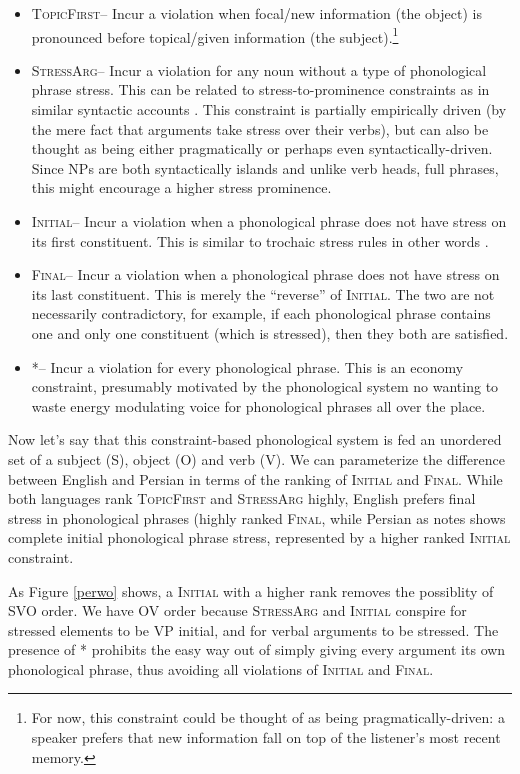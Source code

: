 \documentclass{article}
\newcommand{\topf}{\textsc{TopicFirst}}
\newcommand{\starg}{\textsc{StressArg}}
\newcommand{\troc}{\textsc{Initial{\textphi}}}
\newcommand{\iamb}{\textsc{Final{\textphi}}}
\newcommand{\nophi}{\textsc{*{\textphi}}}
\begin{document}
\begin{itemize}
\item \topf -- Incur a violation when focal/new information (the object) is pronounced before topical/given information (the subject).\footnote{For now, this constraint could be thought of as being pragmatically-driven: a speaker prefers that new information fall on top of the listener's most recent memory.}
\item \starg -- Incur a violation for any noun without a type of phonological phrase stress. This can be related to stress-to-prominence constraints as in similar syntactic accounts \parencite{gutierrez03}. This constraint is partially empirically driven (by the mere fact that arguments take stress over their verbs), but can also be thought as being either pragmatically or perhaps even syntactically-driven. Since NPs are both syntactically islands and unlike verb heads, full phrases, this might encourage a higher stress prominence.
\item \troc -- Incur a violation when a phonological phrase does not have stress on its first constituent. This is similar to trochaic stress rules in other words \parencite{fitzgerald94}.
\item \iamb -- Incur a violation when a phonological phrase does not have stress on its last constituent. This is merely the ``reverse'' of {\troc}. The two are not necessarily contradictory, for example, if each phonological phrase contains one and only one constituent (which is stressed), then they both are satisfied.
\item \nophi -- Incur a violation for every phonological phrase. This is an economy constraint, presumably motivated by the phonological system no wanting to waste energy modulating voice for phonological phrases all over the place.
\end{itemize}

Now let's say that this constraint-based phonological system is fed an unordered set of a subject (S), object (O) and verb (V). We can parameterize the difference between English and Persian in terms of the ranking of {\troc} and {\iamb}. While both languages rank {\topf} and {\starg} highly, English prefers final stress in phonological phrases (highly ranked {\iamb}, while Persian as \textcite{kahnemuyipour03} notes shows complete initial phonological phrase stress, represented by a higher ranked {\troc} constraint.

As Figure \ref{perwo} shows, a {\troc} with a higher rank removes the possiblity of SVO order. We have OV order because {\starg} and {\troc} conspire for stressed elements to be VP initial, and for verbal arguments to be stressed. The presence of {\nophi} prohibits the easy way out of simply giving every argument its own phonological phrase, thus avoiding all violations of {\troc} and {\iamb}.
\end{document}
